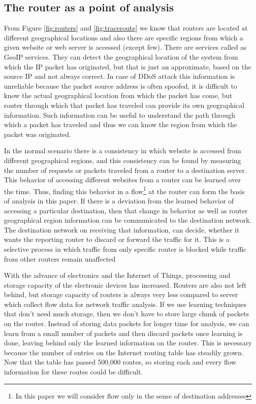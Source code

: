 \documentclass[12pt,oneside,a4paper]{article}
\begin{document}
\subsection{The router as a point of analysis}
From Figure \ref{fig:routers} and \ref{fig:traceroute} we know that routers are located at different geographical locations and also there are specific regions from which a given website or web server is accessed (except few). There are services called as GeoIP services. They can detect the geographical location of the system from which the IP packet has originated, but that is just an approximate, based on the source IP and not always correct. In case of DDoS attack this information is unreliable because the packet source address is often spoofed, it is difficult to know the actual geographical location from which the packet has come, but router through which that packet has traveled can provide its own geographical information. Such information can be useful to understand the path through which a packet has traveled and thus we can know the region from which the packet was originated.\par

In the normal scenario there is a consistency in which website is accessed from different geographical regions, and this consistency can be found by measuring the number of requests or packets traveled from a router to a destination server. This behavior of accessing different websites from a router can be learned over the time. Thus, finding this behavior in a flow\footnote{In this paper we will consider flow only in the sense of destination addresses} at the router can form the basis of analysis in this paper. If there is a deviation from the learned behavior of accessing a particular destination, then that change in behavior as well as router geographical region information can be communicated to the destination network. The destination network on receiving that information, can decide, whether it wants the reporting router to discard or forward the traffic for it. This is a selective process in which traffic from only specific router is blocked while traffic from other routers remain unaffected\par

With the advance of electronics and the Internet of Things, processing and storage capacity of the electronic devices has increased. Routers are also not left behind, but storage capacity of routers is always very less compared to server which collect flow data for network traffic analysis. If we use learning techniques that don't need much storage, then we don't have to store large chunk of packets on the router. Instead of storing data packets for longer time for analysis, we can learn from a small number of packets and then discard packets once learning is done, leaving behind only the learned information on the router. This is necessary because the number of entries on the Internet routing table has steadily grown. Now that the table has passed 500,000 routes\cite{routing-tablesize}, so storing each and every flow information for these routes could be difficult.\par
\end{document}
